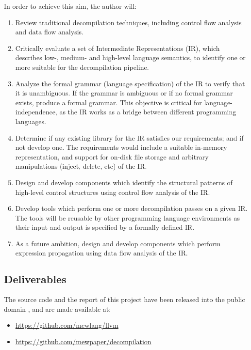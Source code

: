 \documentclass[12pt, a4paper]{article}
\begin{document}
In order to achieve this aim, the author will:

\begin{enumerate}
	\item Review traditional decompilation techniques, including control flow
analysis and data flow analysis.
	\item Critically evaluate a set of Intermediate Representations (IR), which
describes low-, medium- and high-level language semantics, to identify one or
more suitable for the decompilation pipeline.
	\item Analyze the formal grammar (language specification) of the IR to verify
that it is unambiguous. If the grammar is ambiguous or if no formal grammar
exists, produce a formal grammar. This objective is critical for
language-independence, as the IR works as a bridge between different programming
languages.
	\item Determine if any existing library for the IR satisfies our
requirements; and if not develop one. The requirements would include a suitable
in-memory representation, and support for on-disk file storage and arbitrary
manipulations (inject, delete, etc) of the IR.
	\item Design and develop components which identify the structural patterns of
high-level control structures using control flow analysis of the IR.
	\item Develop tools which perform one or more decompilation passes on a given
IR. The tools will be reusable by other programming language environments as
their input and output is specified by a formally defined IR.
	\item As a future ambition, design and develop components which perform
expression propagation using data flow analysis of the IR.
\end{enumerate}


\subsection{Deliverables}

The source code and the report of this project have been released into the
public domain \cite{cc0}, and are made available at:
\begin{itemize}
	\item \url{https://github.com/mewlang/llvm}
	\item \url{https://github.com/mewpaper/decompilation}
\end{itemize}
\end{document}
